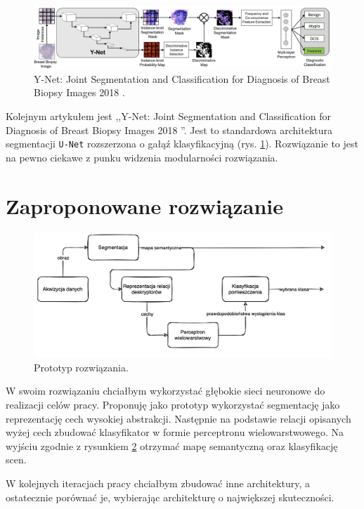 \begin{figure}
    \includegraphics[width=\textwidth]{images/y-net.png}
    \caption{Y-Net: Joint Segmentation and Classification for Diagnosis of Breast Biopsy Images 2018 \cite{mehta2018net}.}
    \label{fig:y-net}
\end{figure}

Kolejnym artykułem jest ,,Y-Net: Joint Segmentation and Classification for Diagnosis of Breast Biopsy Images 2018 \cite{mehta2018net}''. Jest to standardowa architektura segmentacji \texttt{U-Net} rozszerzona o gałąź klasyfikacyjną (rys. \ref{fig:y-net}). Rozwiązanie to jest na pewno ciekawe z punku widzenia modularności rozwiązania.

\section{Zaproponowane rozwiązanie}
\begin{figure}[h]
    \includegraphics[width=\textwidth]{images/own-solution.png}
    \caption{Prototyp rozwiązania.}
    \label{fig:prototype}
\end{figure}
W swoim rozwiązaniu chciałbym wykorzystać głębokie sieci neuronowe do realizacji celów pracy. Proponuję jako prototyp wykorzystać segmentację jako reprezentację cech wysokiej abstrakcji. Następnie na podstawie relacji opisanych wyżej cech zbudować klasyfikator w formie perceptronu wielowarstwowego. Na wyjściu zgodnie z rysunkiem \ref{fig:prototype} otrzymać mapę semantyczną oraz klasyfikację scen.

W kolejnych iteracjach pracy chciałbym zbudować inne architektury, a ostatecznie porównać je, wybierając architekturę o największej skuteczności.